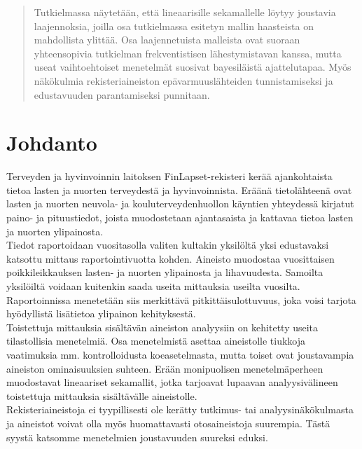 \documentclass[finnish]{docopts}
\begin{document}
\begin{abstract}
Tutkielmassa näytetään, että lineaarisille sekamallelle löytyy joustavia laajennoksia, joilla osa tutkielmassa esitetyn mallin haasteista on mahdollista ylittää. Osa laajennetuista malleista ovat suoraan yhteensopivia tutkielman frekventistisen lähestymistavan kanssa, mutta useat vaihtoehtoiset menetelmät suosivat bayesiläistä ajattelutapaa. Myös näkökulmia rekisteriaineiston epävarmuuslähteiden tunnistamiseksi ja edustavuuden parantamiseksi punnitaan.\\

\end{abstract}

\mytableofcontents

\section{Johdanto}
\label{sec:johdanto}

Terveyden ja hyvinvoinnin laitoksen FinLapset-rekisteri \citep{finlapsetrekisteri} kerää ajankohtaista tietoa lasten ja nuorten terveydestä ja hyvinvoinnista. Eräänä tietolähteenä ovat lasten ja nuorten neuvola- ja kouluterveydenhuollon käyntien yhteydessä kirjatut paino- ja pituustiedot, joista muodostetaan ajantasaista ja kattavaa tietoa lasten ja nuorten ylipainosta.\\

Tiedot raportoidaan vuositasolla valiten kultakin yksilöltä yksi edustavaksi katsottu mittaus raportointivuotta kohden. Aineisto muodostaa vuosittaisen poikkileikkauksen lasten- ja nuorten ylipainosta ja lihavuudesta. Samoilta yksilöiltä voidaan kuitenkin saada useita mittauksia useilta vuosilta. Raportoinnissa menetetään siis merkittävä pitkittäisulottuvuus, joka voisi tarjota hyödyllistä lisätietoa ylipainon kehityksestä.\\

Toistettuja mittauksia sisältävän aineiston analyysiin on kehitetty useita tilastollisia menetelmiä. Osa menetelmistä asettaa aineistolle tiukkoja vaatimuksia mm. kontrolloidusta koeasetelmasta, mutta toiset ovat joustavampia aineiston ominaisuuksien suhteen. Erään monipuolisen menetelmäperheen muodostavat lineaariset sekamallit, jotka tarjoavat lupaavan analyysivälineen toistettuja mittauksia sisältävälle aineistolle.\\

Rekisteriaineistoja ei tyypillisesti ole kerätty tutkimus- tai analyysinäkökulmasta ja aineistot voivat olla myös huomattavasti otosaineistoja suurempia. Tästä syystä katsomme menetelmien joustavuuden suureksi eduksi.\\
\end{document}
